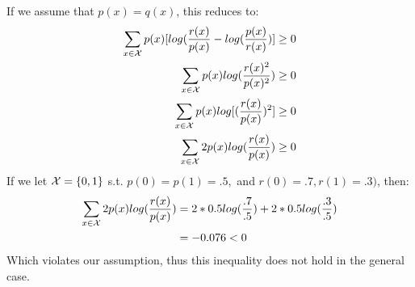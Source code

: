 \documentclass{article}
\begin{document}
If we assume that $p(x) = q(x)$, this reduces to:
\begin{align}
\sum_{x \in  \mathcal{X}} p(x) [log(\frac{r(x)}{p(x)} - log(\frac{p(x)}{r(x)})] &\geq 0\\
\sum_{x \in  \mathcal{X}} p(x) log(\frac{r(x)^2}{p(x)^2}) &\geq 0\\
\sum_{x \in  \mathcal{X}} p(x) log[ (\frac{r(x)}{p(x)})^2 ] &\geq 0\\
\sum_{x \in  \mathcal{X}} 2p(x) log(\frac{r(x)}{p(x)}) &\geq 0\\
\end{align}
If we let $ \mathcal{X} = \{0,1\}$ s.t. $p(0) = p(1) = .5,$ and $r(0) = .7, r(1) = .3)$, then:
\begin{align*}
\sum_{x \in  \mathcal{X}} 2p(x) log(\frac{r(x)}{p(x)}) &= 2*0.5log(\frac{.7}{.5}) + 2*0.5log(\frac{.3}{.5})\\
&= -0.076 < 0
\end{align*}
Which violates our assumption, thus this inequality does not hold in the general case.  \QED


\end{document}
